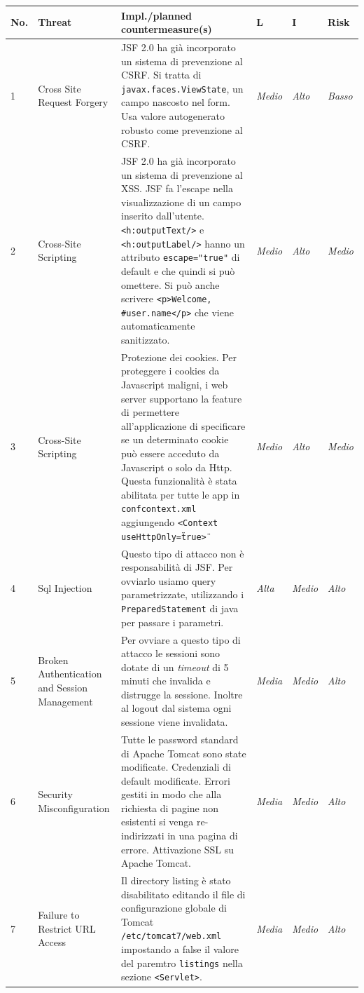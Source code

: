 \documentclass{article}
\begin{document}
\begin{footnotesize}
\begin{longtable}{p{0.3cm}p{3cm}p{4.6cm}p{0.5cm}p{0.5cm}p{0.5cm}}
No. & Threat & Impl./planned countermeasure(s) & L & I & Risk \\
\hline
 1 & Cross Site Request Forgery & JSF 2.0 ha già incorporato un sistema di prevenzione al CSRF. Si tratta di {\tt javax.faces.ViewState}, un campo nascosto nel form. Usa valore autogenerato robusto come prevenzione al CSRF. & {\it Medio} & {\it Alto} & {\it Basso} \\
\hline
 2 & Cross-Site Scripting & JSF 2.0 ha già incorporato un sistema di prevenzione al XSS. JSF fa l'escape nella visualizzazione di un campo inserito dall'utente. {\tt <h:outputText/>} e {\tt <h:outputLabel/>} hanno un attributo {\tt escape="true"} di default e che quindi si può omettere. Si può anche scrivere {\tt<p>Welcome, \#{user.name}</p>} che viene automaticamente sanitizzato. & {\it Medio} & {\it Alto} & {\it Medio} \\
\hline
3 & Cross-Site Scripting & Protezione dei cookies. Per proteggere i cookies da Javascript maligni, i web server supportano la feature di permettere all'applicazione di specificare se un determinato cookie può essere acceduto da Javascript o solo da Http. Questa funzionalità è stata abilitata per tutte le app in {\tt conf\/context.xml} aggiungendo {\tt <Context useHttpOnly=\"true\">} & {\it Medio} & {\it Alto} & {\it Medio} \\
\hline
 4 & Sql Injection & Questo tipo di attacco non è responsabilità di JSF. Per ovviarlo usiamo query parametrizzate, utilizzando i {\tt PreparedStatement} di java per passare i parametri. & {\it Alta} & {\it Medio} & {\it Alto}\\
\hline
 5 & Broken Authentication and Session Management  & Per ovviare a questo tipo di attacco le sessioni sono dotate di un \emph{timeout} di 5 minuti che invalida e distrugge la sessione. Inoltre al logout dal sistema ogni sessione viene invalidata.
 & {\it Media} & {\it Medio} & {\it Alto}\\
\hline
 6 & Security Misconfiguration & Tutte le password standard di Apache Tomcat sono state modificate. Credenziali di default modificate. Errori gestiti in modo che alla richiesta di pagine non esistenti si venga re-indirizzati in una pagina di errore. Attivazione SSL su Apache Tomcat. & {\it Media} & {\it Medio} & {\it Alto}\\
\hline
 7 & Failure to Restrict URL Access & Il directory listing è stato disabilitato editando il file di configurazione globale di Tomcat {\tt /etc/tomcat7/web.xml} impostando a false il valore del paremtro {\tt listings} nella sezione {\tt <Servlet>}. & {\it Media} & {\it Medio} & {\it Alto}\\

\end{longtable}
\end{footnotesize}
\end{document}

